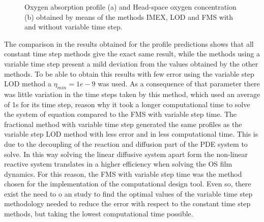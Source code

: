 \begin{refsection}
\begin{figure}[ht]
    \centering
    \caption{Oxygen absorption profile (a) and  Head-space oxygen concentration (b) obtained by means of the methods IMEX, LOD and FMS with and without variable time step.}
    \label{fig:Comparacion_resultados_metodos}
\end{figure}

The comparison in the results obtained for the profile predictions shows that all constant time step methods give the exact same result, while the methods using a variable time step present a mild deviation from the values obtained by the other methods. To be able to obtain this results with few error using the variable step LOD method a $\eta_{min}=1e-9$ was used. As a consequence of that parameter there was little variation in the time steps taken by this method, which used an average of 1s for its time step, reason why it took a longer computational time to solve the system of equation compared to the FMS with variable step time. The fractional method with variable time step generated the same profiles as the variable step LOD method with less error and in less computational time. This is due to the  decoupling of the reaction and diffusion part of the PDE system to solve. In this way solving the linear diffusive system apart form the non-linear reactive system translates in a higher efficiency when solving the OS film dynamics. For this reason, the FMS with variable step time was the method chosen for the implementation of the computational design tool. Even so, there exist the need to o an study to find the optimal values of the variable time step methodology needed to reduce the error with respect to the constant time step methods, but taking the lowest computational time possible. 


\end{refsection}
